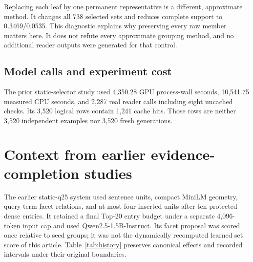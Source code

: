 \documentclass[pdflatex,sn-mathphys-num]{sn-jnl}
\begin{document}
Replacing each leaf by one permanent representative is a different,
approximate method. It changes all 738 selected sets and reduces complete
support to 0.3469/0.0535. This diagnostic explains why preserving every raw
member matters here. It does not refute every approximate grouping method,
and no additional reader outputs were generated for that control.

\subsection{Model calls and experiment cost}

The prior static-selector study used 4,350.28 GPU process-wall seconds,
10,541.75 measured CPU seconds, and 2,287 real reader calls including eight
uncached checks. Its 3,520 logical rows contain 1,241 cache hits. Those rows
are neither 3,520 independent examples nor 3,520 fresh generations.

\section{Context from earlier evidence-completion studies}\label{sec:history}
The earlier static-q25 system used sentence units, compact MiniLM geometry,
query-term facet relations, and at most four inserted units after ten
protected dense entries. It retained a final Top-20 entry budget under a
separate 4,096-token input cap and used Qwen2.5-1.5B-Instruct. Its facet
proposal was scored once relative to seed groups; it was not the dynamically
recomputed learned set score of this article. Table~\ref{tab:history}
preserves canonical effects and recorded intervals under their original
boundaries.
\end{document}
